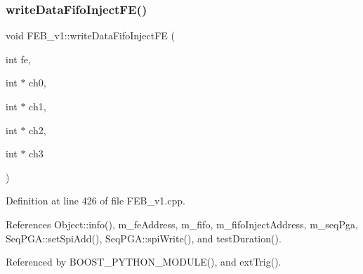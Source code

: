 \subsubsection{\texorpdfstring{write\+Data\+Fifo\+Inject\+F\+E()}{writeDataFifoInjectFE()}}
{\footnotesize\ttfamily void F\+E\+B\+\_\+v1\+::write\+Data\+Fifo\+Inject\+FE (\begin{DoxyParamCaption}\item[{int}]{fe,  }\item[{int $\ast$}]{ch0,  }\item[{int $\ast$}]{ch1,  }\item[{int $\ast$}]{ch2,  }\item[{int $\ast$}]{ch3 }\end{DoxyParamCaption})}



Definition at line 426 of file F\+E\+B\+\_\+v1.\+cpp.



References Object\+::info(), m\+\_\+fe\+Address, m\+\_\+fifo, m\+\_\+fifo\+Inject\+Address, m\+\_\+seq\+Pga, Seq\+P\+G\+A\+::set\+Spi\+Add(), Seq\+P\+G\+A\+::spi\+Write(), and test\+Duration().



Referenced by B\+O\+O\+S\+T\+\_\+\+P\+Y\+T\+H\+O\+N\+\_\+\+M\+O\+D\+U\+L\+E(), and ext\+Trig().


